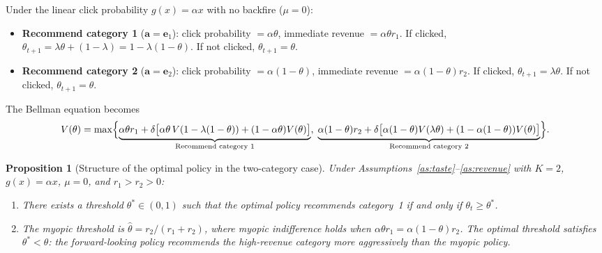 \documentclass[11pt]{article}
\newtheorem{proposition}{Proposition}
\begin{document}
Under the linear click probability $g(x) = \alpha x$ with no backfire ($\mu = 0$):

\begin{itemize}[leftmargin=1.5em]
\item \textbf{Recommend category 1} ($\mathbf{a} = \mathbf{e}_1$): click probability $= \alpha \theta$, immediate revenue $= \alpha \theta r_1$. If clicked, $\theta_{t+1} = \lambda \theta + (1-\lambda) = 1 - \lambda(1-\theta)$. If not clicked, $\theta_{t+1} = \theta$.

\item \textbf{Recommend category 2} ($\mathbf{a} = \mathbf{e}_2$): click probability $= \alpha(1-\theta)$, immediate revenue $= \alpha(1-\theta) r_2$. If clicked, $\theta_{t+1} = \lambda \theta$. If not clicked, $\theta_{t+1} = \theta$.
\end{itemize}

The Bellman equation becomes
\begin{equation}\label{eq:bellman2}
V(\theta) = \max \Bigl\{
\underbrace{\alpha \theta r_1 + \delta\bigl[\alpha\theta \, V(1-\lambda(1-\theta)) + (1-\alpha\theta) V(\theta)\bigr]}_{\text{Recommend category 1}}, \;
\underbrace{\alpha(1-\theta) r_2 + \delta\bigl[\alpha(1-\theta) V(\lambda\theta) + (1-\alpha(1-\theta)) V(\theta)\bigr]}_{\text{Recommend category 2}}
\Bigr\}.
\end{equation}

\begin{proposition}[Structure of the optimal policy in the two-category case]\label{prop:two_cat}
Under Assumptions~\ref{as:taste}--\ref{as:revenue} with $K=2$, $g(x) = \alpha x$, $\mu = 0$, and $r_1 > r_2 > 0$:
\begin{enumerate}[label=(\alph*)]
\item There exists a threshold $\theta^* \in (0,1)$ such that the optimal policy recommends category~1 if and only if $\theta_t \ge \theta^*$.
\item The myopic threshold is $\hat{\theta} = r_2 / (r_1 + r_2)$, where myopic indifference holds when $\alpha \theta r_1 = \alpha(1-\theta) r_2$. The optimal threshold satisfies $\theta^* < \hat{\theta}$: the forward-looking policy recommends the high-revenue category more aggressively than the myopic policy.
\end{enumerate}
\end{proposition}
\end{document}
